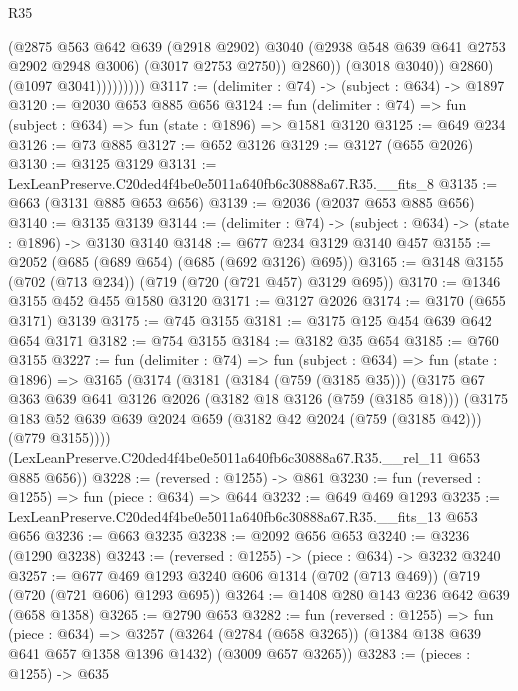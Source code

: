 \begin{lexlean}{R35}
\begin{coremodule}
                            (@2875
                              @563
                              @642
                              @639
                              (@2918 @2902)
                              @3040
                              (@2938 @548 @639 @641 @2753 @2902 @2948 @3006)
                              (@3017 @2753 @2750))
                            @2860))
                        (@3018 @3040))
                      @2860)
                    (@1097 @3041)))))))))
@3117 := (delimiter : @74) -> (subject : @634) -> @1897
@3120 := @2030 @653 @885 @656
@3124 := fun (delimiter : @74) => fun (subject : @634) => fun (state : @1896) => @1581 @3120
@3125 := @649 @234
@3126 := @73 @885
@3127 := @652 @3126
@3129 := @3127 (@655 @2026)
@3130 := @3125 @3129
@3131 := LexLeanPreserve.C20ded4f4be0e5011a640fb6c30888a67.R35.__fits_8
@3135 := @663 (@3131 @885 @653 @656)
@3139 := @2036 (@2037 @653 @885 @656)
@3140 := @3135 @3139
@3144 := (delimiter : @74) -> (subject : @634) -> (state : @1896) -> @3130 @3140
@3148 := @677 @234 @3129 @3140 @457
@3155 := @2052 (@685 (@689 @654) (@685 (@692 @3126) @695))
@3165 := @3148 @3155 (@702 (@713 @234)) (@719 (@720 (@721 @457) @3129 @695))
@3170 := @1346 @3155 @452 @455 @1580 @3120
@3171 := @3127 @2026
@3174 := @3170 (@655 @3171) @3139
@3175 := @745 @3155
@3181 := @3175 @125 @454 @639 @642 @654 @3171
@3182 := @754 @3155
@3184 := @3182 @35 @654
@3185 := @760 @3155
@3227 := fun (delimiter : @74) =>
  fun (subject : @634) =>
  fun (state : @1896) =>
  @3165
    (@3174
      (@3181
        (@3184 (@759 (@3185 @35)))
        (@3175
          @67
          @363
          @639
          @641
          @3126
          @2026
          (@3182 @18 @3126 (@759 (@3185 @18)))
          (@3175 @183 @52 @639 @639 @2024 @659 (@3182 @42 @2024 (@759 (@3185 @42))) (@779 @3155))))
      (LexLeanPreserve.C20ded4f4be0e5011a640fb6c30888a67.R35.__rel_11 @653 @885 @656))
@3228 := (reversed : @1255) -> @861
@3230 := fun (reversed : @1255) => fun (piece : @634) => @644
@3232 := @649 @469 @1293
@3235 := LexLeanPreserve.C20ded4f4be0e5011a640fb6c30888a67.R35.__fits_13 @653 @656
@3236 := @663 @3235
@3238 := @2092 @656 @653
@3240 := @3236 (@1290 @3238)
@3243 := (reversed : @1255) -> (piece : @634) -> @3232 @3240
@3257 := @677 @469 @1293 @3240 @606 @1314 (@702 (@713 @469)) (@719 (@720 (@721 @606) @1293 @695))
@3264 := @1408 @280 @143 @236 @642 @639 (@658 @1358)
@3265 := @2790 @653
@3282 := fun (reversed : @1255) =>
  fun (piece : @634) =>
  @3257
    (@3264 (@2784 (@658 @3265)) (@1384 @138 @639 @641 @657 @1358 @1396 @1432) (@3009 @657 @3265))
@3283 := (pieces : @1255) -> @635

\end{coremodule}
\end{lexlean}
